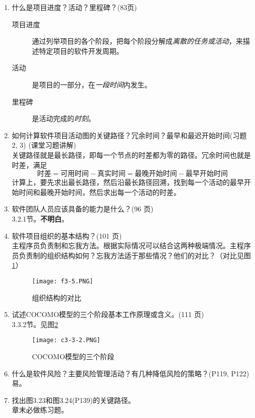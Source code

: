 \documentclass[14pt, letterpaper, UTF8, fontset=windowsnew, heading=true]{article}
\begin{document}
\begin{enumerate}
	\item 什么是项目进度？活动？里程碑？(83页)
	\begin{description}
		\item[项目进度] 通过列举项目的各个阶段，把每个阶段分解成\emph{离散的任务或活动}，来描述特定项目的软件开发周期。
		\item[活动] 是项目的一部分，在\emph{一段时间}内发生。
		\item[里程碑] 是活动完成的\emph{时刻}。
	\end{description}

	\item 如何计算软件项目活动图的关键路径？冗余时间？最早和最迟开始时间(习题 2, 3) (课堂习题讲解)\\
	关键路径就是最长路径，即每一个节点的时差都为零的路径。冗余时间也就是时差，满足
	$$\text{时差} = \text{可用时间} - \text{真实时间} = \text{最晚开始时间} - \text{最早开始时间}$$
	计算上，要先求出最长路径，然后沿最长路径回溯，找到每一个活动的最早开始时间和最晚开始时间，然后求出每一个活动的时差。
	
	\item 软件团队人员应该具备的能力是什么？(96 页)\\
	3.2.1节。\textbf{不明白}。
	
	\item 软件项目组织的基本结构？(101 页) \\
	主程序员负责制和忘我方法。根据实际情况可以结合这两种极端情况。主程序员负责制的组织结构如何？忘我方法适于那些情况？他们的对比？（对比见图\ref{fig:groupstructure}）
	\begin{figure}[h]
		\centering
		\texttt{[image: f3-5.PNG]}
		\caption{组织结构的对比}
		\label{fig:groupstructure}
	\end{figure}
	
	
	\item 试述COCOMO模型的三个阶段基本工作原理或含义。(111 页) \\
	3.3.2节。见图\ref{fig:cocomo}
	\begin{figure}[h]
		\centering
		\texttt{[image: c3-3-2.PNG]}
		\caption{COCOMO模型的三个阶段}
		\label{fig:cocomo}
	\end{figure}
	
	\item 什么是软件风险？主要风险管理活动？有几种降低风险的策略？(P119, P122) \\
	易。
	
	\item 找出图3.23和图3.24(P139)的关键路径。\\
	章末必做练习题。
\end{enumerate}
\end{document}

